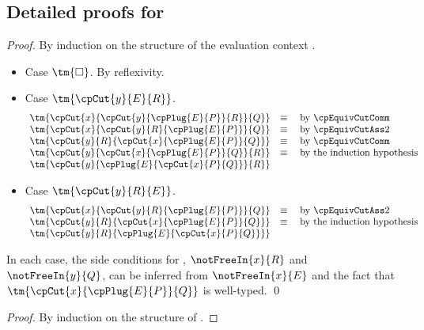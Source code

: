 \documentclass[UKenglish]{llncs}
\begin{document}
\clearpage
\printbibliography

\clearpage
\appendix
\begin{subappendices}
  \renewcommand{\thesection}{\Alph{section}}%

  \section{Detailed proofs for \cp}
  \thmcpdisplaycut
  \begin{proof}
    By induction on the structure of the evaluation context .
    \begin{itemize}
    \item
      Case $\tm{\Box}$. By reflexivity.
    \item
      Case $\tm{\cpCut{y}{E}{R}}$.
      \[\!
        \begin{array}{ll}
          \tm{\cpCut{x}{\cpCut{y}{\cpPlug{E}{P}}{R}}{Q}} & \equiv \quad \text{by \cpEquivCutComm}\\
          \tm{\cpCut{x}{\cpCut{y}{R}{\cpPlug{E}{P}}}{Q}} & \equiv \quad \text{by \cpEquivCutAss2}\\
          \tm{\cpCut{y}{R}{\cpCut{x}{\cpPlug{E}{P}}{Q}}} & \equiv \quad \text{by \cpEquivCutComm}\\
          \tm{\cpCut{y}{\cpCut{x}{\cpPlug{E}{P}}{Q}}{R}} & \equiv \quad \text{by the induction hypothesis}\\ 
          \tm{\cpCut{y}{\cpPlug{E}{\cpCut{x}{P}{Q}}}{R}} &
        \end{array}
      \]
    \item
      Case $\tm{\cpCut{y}{R}{E}}$.
      \[\!
        \begin{array}{ll}
          \tm{\cpCut{x}{\cpCut{y}{R}{\cpPlug{E}{P}}}{Q}} & \equiv \quad \text{by \cpEquivCutAss2}\\
          \tm{\cpCut{y}{R}{\cpCut{x}{\cpPlug{E}{P}}{Q}}} & \equiv \quad \text{by the induction hypothesis}\\
          \tm{\cpCut{y}{R}{\cpPlug{E}{\cpCut{x}{P}{Q}}}}
        \end{array}
      \]
    \end{itemize}
    In each case, the side conditions for , $\notFreeIn{x}{R}$ and
    $\notFreeIn{y}{Q}$, can be inferred from $\notFreeIn{x}{E}$ and the fact that
    $\tm{\cpCut{x}{\cpPlug{E}{P}}{Q}}$ is well-typed.
    \qed
  \end{proof}
  \thmcpprogresslink
  \begin{proof}
    By induction on the structure of .

\end{proof}
\end{subappendices}
\end{document}
